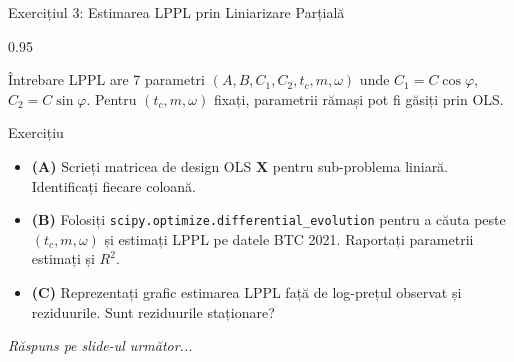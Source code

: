 \documentclass[9pt, aspectratio=169, t]{beamer}
\begin{document}
\begin{frame}{Exercițiul 3: Estimarea LPPL prin Liniarizare Parțială}
    \begin{cminipage}{0.95\textwidth}
    \begin{alertblock}{Întrebare}
        LPPL are 7 parametri $(A, B, C_1, C_2, t_c, m, \omega)$ unde $C_1 = C\cos\varphi$, $C_2 = C\sin\varphi$.
        Pentru $(t_c, m, \omega)$ fixați, parametrii rămași pot fi găsiți prin OLS.
    \end{alertblock}

    \vspace{0.15cm}

    \begin{block}{Exercițiu}
        \begin{itemize}\setlength{\itemsep}{3pt}
            \item \textcolor{MainBlue}{\textbf{(A)}} Scrieți matricea de design OLS $\mathbf{X}$ pentru sub-problema liniară. Identificați fiecare coloană.
            \item \textcolor{MainBlue}{\textbf{(B)}} Folosiți \texttt{scipy.optimize.differential\_evolution} pentru a căuta peste $(t_c, m, \omega)$ și estimați LPPL pe datele BTC 2021. Raportați parametrii estimați și $R^2$.
            \item \textcolor{MainBlue}{\textbf{(C)}} Reprezentați grafic estimarea LPPL față de log-prețul observat și reziduurile. Sunt reziduurile staționare?
        \end{itemize}
    \end{block}

    \vspace{0.15cm}

    \begin{center}
        \textit{Răspuns pe slide-ul următor...}
    \end{center}
    \end{cminipage}
\end{frame}
\end{document}

